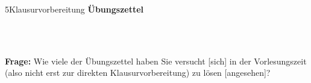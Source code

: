 \documentclass[xcolor=table,9pt,aspectratio=169]{beamer}
\begin{document}
\begin{frame}{\vspace*{10mm}5\hspace*{1em}Klausurvorbereitung}
\textbf{Übungszettel}\\
\begin{multicols}{2}
   \begin{center}
      \\
      \\
   \end{center}
\end{multicols}
\textbf{Frage:} Wie viele der Übungszettel haben Sie versucht [sich] in der Vorlesungszeit (also nicht erst zur direkten Klausurvorbereitung) zu lösen [angesehen]?
\end{frame}
\end{document}
